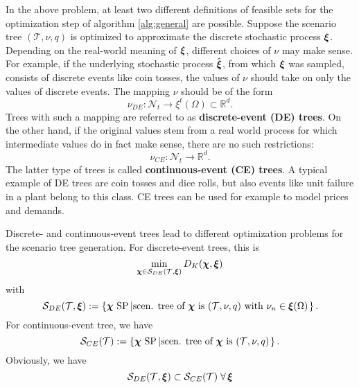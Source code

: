 In the above problem, at least two different definitions of feasible sets for the optimization step of algorithm \ref{alg:general} are possible.
Suppose the scenario tree $(\mathcal{T}, \nu, q)$ is optimized to approximate the discrete stochastic process $\boldsymbol\xi$.
Depending on the real-world meaning of $\boldsymbol\xi$, different choices of $\nu$ may make sense.
For example, if the underlying stochastic process $\hat{\boldsymbol\xi}$, from which $\boldsymbol\xi$ was sampled, consists of discrete events like coin tosses, the values of $\nu$ should take on only the values of discrete events.
The mapping $\nu$ should be of the form
\begin{equation}
  \label{eq:65}
  \nu_{DE}:\mathcal{N}_t\rightarrow \xi^t(\Omega)\subset\mathbb{R}^d.
\end{equation}
Trees with such a mapping are referred to as \textbf{discrete-event (DE) trees}.
On the other hand, if the original values stem from a real world process for which intermediate values do in fact make sense, there are no such restrictions:
\begin{equation}
  \label{eq:66}
  \nu_{CE}:\mathcal{N}_t\rightarrow \mathbb{R}^d.
\end{equation}
The latter type of trees is called \textbf{continuous-event (CE) trees}.
A typical example of DE trees are coin tosses and dice rolls, but also events like unit failure in a plant belong to this class.
CE trees can be used for example to model prices and demands.

Discrete- and continuous-event trees lead to different optimization problems for the scenario tree generation.
For discrete-event trees, this is
\begin{equation}
  \label{eq:67}
  \min\limits_{\boldsymbol\chi\in \mathcal{S}_{DE}(\mathcal{T},\boldsymbol\xi)}D_K(\boldsymbol\chi, \boldsymbol\xi)
\end{equation}
with
\begin{equation}
  \label{eq:68}
  \mathcal{S}_{DE}(\mathcal{T},\boldsymbol\xi) := \left\{\boldsymbol\chi \text{ SP}\left|\text{scen. tree of }\boldsymbol\chi\text{ is } (\mathcal{T},\nu,q)\text{ with }\nu_n\in\boldsymbol\xi(\Omega)\right.\right\}.
\end{equation}
For continuous-event tree, we have
\begin{equation}
  \label{eq:69}
  \mathcal{S}_{CE}(\mathcal{T}) := \left\{\boldsymbol\chi\text{ SP}\left|\text{scen. tree of }\boldsymbol\chi\text{ is } (\mathcal{T},\nu,q)\right.\right\}.
\end{equation}
Obviously, we have
\begin{equation}
  \label{eq:70}
  \mathcal{S}_{DE}(\mathcal{T},\boldsymbol\xi) \subset   \mathcal{S}_{CE}(\mathcal{T}) \;\forall\,\boldsymbol\xi
\end{equation}

